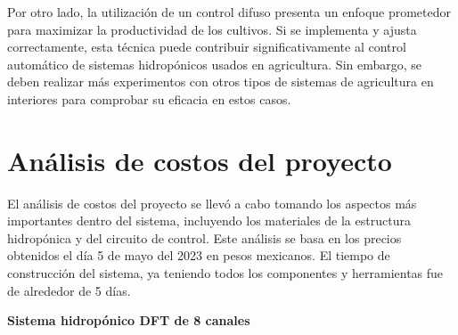 Por otro lado, la utilización de un control difuso presenta un enfoque prometedor para maximizar la productividad de los cultivos. Si se implementa y ajusta correctamente, esta técnica puede contribuir significativamente al control automático de sistemas hidropónicos usados en agricultura. Sin embargo, se deben realizar más experimentos con otros tipos de sistemas de agricultura en interiores para comprobar su eficacia en estos casos.

\section{Análisis de costos del proyecto}
El análisis de costos del proyecto se llevó a cabo tomando los aspectos más importantes dentro del sistema, incluyendo los materiales de la estructura hidropónica y del circuito de control. Este análisis se basa en los precios obtenidos el día 5 de mayo del 2023 en pesos mexicanos. El tiempo de construcción del sistema, ya teniendo todos los componentes y herramientas fue de alrededor de 5 días.

\textbf{Sistema hidropónico DFT de 8 canales}

